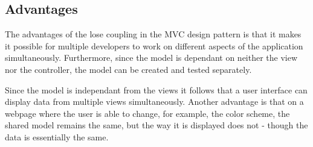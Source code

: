 \subsection{Advantages}

The advantages of the lose coupling in the MVC design pattern is that it makes it possible for 
multiple developers to work on different aspects of the application simultaneously. 
Furthermore, since the model is dependant on neither the view nor the controller, the model 
can be created and tested separately\cite{modelviewcontroller}.

Since the model is independant from the views it follows that a user interface can display data from multiple 
views simultaneously. Another advantage is that on a webpage where the user is able to change, for example, the 
color scheme, the shared model remains the same, but the way it is displayed does not - though the data is 
essentially the same\cite{modelviewcontroller}.